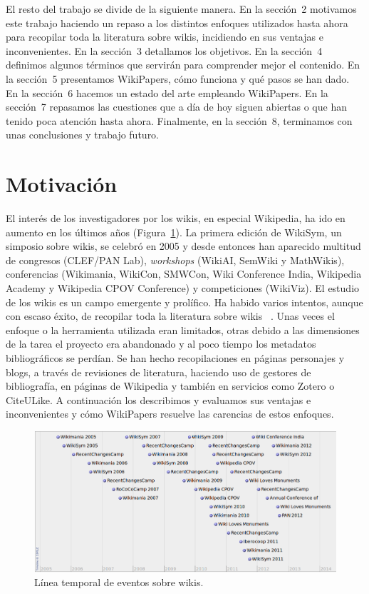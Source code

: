 \documentclass[11pt,onecolumn]{article}
\begin{document}
El resto del trabajo se divide de la siguiente manera. En la sección~2 motivamos este trabajo haciendo un repaso a los distintos enfoques utilizados hasta ahora para recopilar toda la literatura sobre wikis, incidiendo en sus ventajas e inconvenientes. En la sección~3 detallamos los objetivos. En la sección~4 definimos algunos términos que servirán para comprender mejor el contenido. En la sección~5 presentamos WikiPapers, cómo funciona y qué pasos se han dado. En la sección~6 hacemos un estado del arte empleando WikiPapers. En la sección~7 repasamos las cuestiones que a día de hoy siguen abiertas o que han tenido poca atención hasta ahora. Finalmente, en la sección~8, terminamos con unas conclusiones y trabajo futuro.

\clearpage

\section{Motivación}

El interés de los investigadores por los wikis, en especial Wikipedia, ha ido en aumento en los últimos años (Figura~\ref{fig:wptimeline}). La primera edición de WikiSym, un simposio sobre wikis, se celebró en 2005 y desde entonces han aparecido multitud de congresos (CLEF/PAN Lab), \emph{workshops} (WikiAI, SemWiki y MathWikis), conferencias (Wikimania, WikiCon, SMWCon, Wiki Conference India, Wikipedia Academy y Wikipedia CPOV Conference) y competiciones (WikiViz). El estudio de los wikis es un campo emergente y prolífico. Ha habido varios intentos, aunque con escaso éxito, de recopilar toda la literatura sobre wikis ~\citep{ayers2011}. Unas veces el enfoque o la herramienta utilizada eran limitados, otras debido a las dimensiones de la tarea el proyecto era abandonado y al poco tiempo los metadatos bibliográficos se perdían. Se han hecho recopilaciones en páginas personajes y blogs, a través de revisiones de literatura, haciendo uso de gestores de bibliografía, en páginas de Wikipedia y también en servicios como Zotero o CiteULike. A continuación los describimos y evaluamos sus ventajas e inconvenientes y cómo WikiPapers resuelve las carencias de estos enfoques.

\begin{figure}[htb]
    \centering
    \includegraphics[width=\textwidth]{wptimeline.png} %
    \caption{Línea temporal de eventos sobre wikis.}
    \label{fig:wptimeline}
\end{figure}
\end{document}
